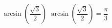  {$\arcsin \left( \dfrac{\sqrt{3}}{2} \right)$}
{ $\arcsin \left( \dfrac{\sqrt{3}}{2} \right) = \dfrac{\pi}{3}$}
